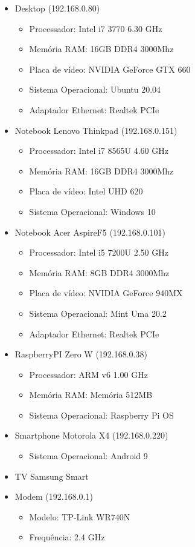 \documentclass[12pt]{article}
\begin{document}
\begin{itemize}
    \item Desktop  (192.168.0.80)
    \begin{itemize}
        \item Processador: Intel i7 3770 6.30 GHz
        \item Memória RAM: 16GB DDR4 3000Mhz
        \item Placa de vídeo: NVIDIA GeForce GTX 660
        \item Sistema Operacional: Ubuntu 20.04
        \item Adaptador Ethernet: Realtek PCIe
    \end{itemize}
    \item Notebook Lenovo Thinkpad (192.168.0.151)
    \begin{itemize}
        \item Processador: Intel i7 8565U 4.60 GHz
        \item Memória RAM: 16GB DDR4 3000Mhz
        \item Placa de vídeo: Intel UHD 620
        \item Sistema Operacional: Windows 10
    \end{itemize}
    \item Notebook Acer AspireF5 (192.168.0.101)
    \begin{itemize}
        \item Processador: Intel i5 7200U 2.50 GHz
        \item Memória RAM: 8GB DDR4 3000Mhz
        \item Placa de vídeo: NVIDIA GeForce 940MX
        \item Sistema Operacional: Mint Uma 20.2
        \item Adaptador Ethernet: Realtek PCIe
    \end{itemize}
    \item RaspberryPI Zero W (192.168.0.38)
    \begin{itemize}
        \item Processador: ARM v6 1.00 GHz
        \item Memória RAM: Memória 512MB
        \item Sistema Operacional: Raspberry Pi OS
    \end{itemize}
    \item Smartphone Motorola X4 (192.168.0.220)
    \begin{itemize}
        \item Sistema Operacional: Android 9
    \end{itemize}
    \item TV Samsung Smart
    \item Modem (192.168.0.1)
    \begin{itemize}
        \item Modelo: TP-Link WR740N
        \item Frequência: 2.4 GHz
    \end{itemize}
\end{itemize}
\end{document}
